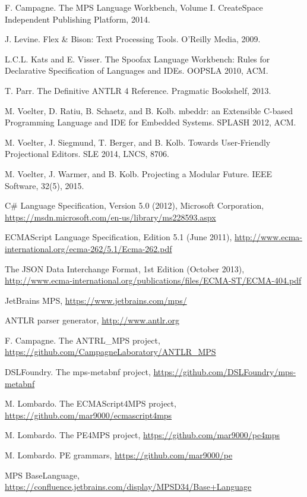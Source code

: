 \documentclass[sigplan,10pt,preprint]{acmart}
\begin{document}
\begin{thebibliography}{}

 F. Campagne. The MPS Language Workbench, Volume I. CreateSpace Independent Publishing Platform, 2014.

 J. Levine. Flex \& Bison: Text Processing Tools. O'Reilly Media, 2009.

 L.C.L. Kats and E. Visser. The Spoofax Language Workbench: Rules for Declarative Specification of Languages and IDEs. OOPSLA 2010, ACM.

 T. Parr. The Definitive ANTLR 4 Reference. Pragmatic Bookshelf, 2013.

 M. Voelter, D. Ratiu, B. Schaetz, and B. Kolb. mbeddr: an Extensible C-based Programming Language and IDE for Embedded Systems. SPLASH 2012, ACM.

 M. Voelter, J. Siegmund, T. Berger, and B. Kolb. Towards User-Friendly Projectional Editors. SLE 2014, LNCS, 8706.

 M. Voelter, J. Warmer, and B. Kolb. Projecting a Modular Future. IEEE Software, 32(5), 2015.

 C\# Language Specification, Version 5.0 (2012), Microsoft Corporation, \url{https://msdn.microsoft.com/en-us/library/ms228593.aspx}

 ECMAScript Language Specification, Edition 5.1 (June 2011), \url{http://www.ecma-international.org/ecma-262/5.1/Ecma-262.pdf}

 The JSON Data Interchange Format, 1st Edition (October 2013), \url{http://www.ecma-international.org/publications/files/ECMA-ST/ECMA-404.pdf}

 JetBrains MPS, \url{https://www.jetbrains.com/mps/}

 ANTLR parser generator, \url{http://www.antlr.org}

 F. Campagne. The ANTRL{\_}MPS project, \url{https://github.com/CampagneLaboratory/ANTLR_MPS}

 DSLFoundry. The mps-metabnf project, \url{https://github.com/DSLFoundry/mps-metabnf}

 M. Lombardo. The ECMAScript4MPS project, \url{https://github.com/mar9000/ecmascript4mps}

 M. Lombardo. The PE4MPS project, \url{https://github.com/mar9000/pe4mps}

 M. Lombardo. PE grammars, \url{https://github.com/mar9000/pe}

 MPS BaseLanguage, \url{https://confluence.jetbrains.com/display/MPSD34/Base+Language}

\end{thebibliography}
\end{document}
